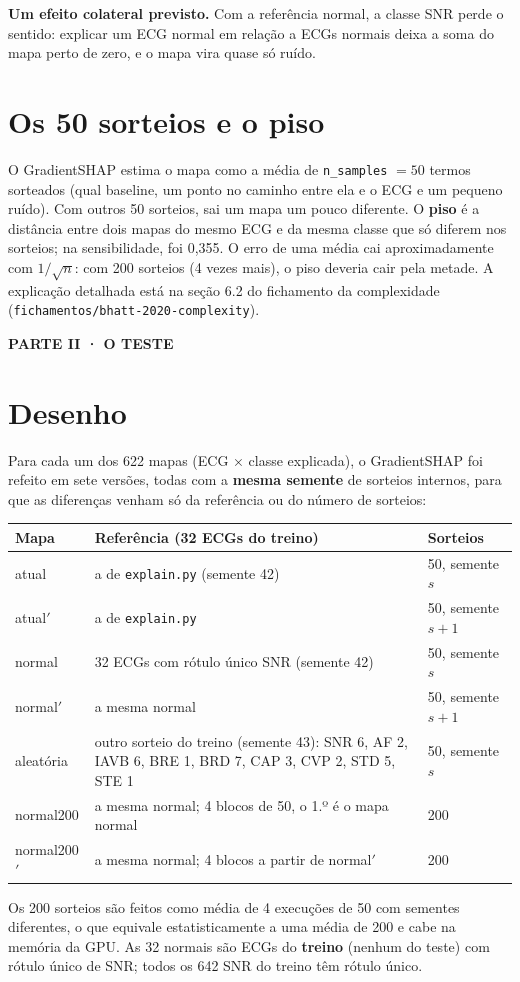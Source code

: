 \documentclass[11pt,a4paper]{article}
\newcommand{\partbar}[1]{\par\vspace{1.2em}\noindent\colorbox{black!80}{\parbox{\dimexpr\linewidth-2\fboxsep}{\color{white}\bfseries\sffamily\MakeUppercase{#1}}}\par\vspace{0.4em}}
\begin{document}
\textbf{Um efeito colateral previsto.} Com a referência normal, a classe SNR perde o sentido: explicar um ECG normal em relação a ECGs normais deixa a soma do mapa perto de zero, e o mapa vira quase só ruído.

\section{Os 50 sorteios e o piso}
O GradientSHAP estima o mapa como a média de \texttt{n\_samples} $= 50$ termos sorteados (qual baseline, um ponto no caminho entre ela e o ECG e um pequeno ruído). Com outros 50 sorteios, sai um mapa um pouco diferente. O \textbf{piso} é a distância entre dois mapas do mesmo ECG e da mesma classe que só diferem nos sorteios; na sensibilidade, foi 0,355. O erro de uma média cai aproximadamente com $1/\sqrt{n}$: com 200 sorteios (4 vezes mais), o piso deveria cair pela metade. A explicação detalhada está na seção 6.2 do fichamento da complexidade (\texttt{fichamentos/bhatt-2020-complexity}).

\partbar{Parte II · O teste}

\section{Desenho}
Para cada um dos 622 mapas (ECG × classe explicada), o GradientSHAP foi refeito em sete versões, todas com a \textbf{mesma semente} de sorteios internos, para que as diferenças venham só da referência ou do número de sorteios:
\begin{center}\small
\begin{tabularx}{\linewidth}{lXl}
\toprule
\textbf{Mapa} & \textbf{Referência (32 ECGs do treino)} & \textbf{Sorteios} \\
\midrule
atual & a de \texttt{explain.py} (semente 42) & 50, semente $s$ \\
atual$'$ & a de \texttt{explain.py} & 50, semente $s+1$ \\
normal & 32 ECGs com rótulo único SNR (semente 42) & 50, semente $s$ \\
normal$'$ & a mesma normal & 50, semente $s+1$ \\
aleatória & outro sorteio do treino (semente 43): SNR 6, AF 2, IAVB 6, BRE 1, BRD 7, CAP 3, CVP 2, STD 5, STE 1 & 50, semente $s$ \\
normal200 & a mesma normal; 4 blocos de 50, o 1.º é o mapa normal & 200 \\
normal200$'$ & a mesma normal; 4 blocos a partir de normal$'$ & 200 \\
\bottomrule
\end{tabularx}
\end{center}
Os 200 sorteios são feitos como média de 4 execuções de 50 com sementes diferentes, o que equivale estatisticamente a uma média de 200 e cabe na memória da GPU. As 32 normais são ECGs do \textbf{treino} (nenhum do teste) com rótulo único de SNR; todos os 642 SNR do treino têm rótulo único.
\end{document}
